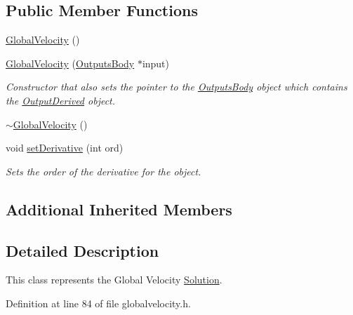 \subsection*{Public Member Functions}
\begin{DoxyCompactItemize}
\item 
\hyperlink{classosea_1_1ofreq_1_1_global_velocity_a444ab39b351acd4e6ca7dc8088e2a9b8}{Global\-Velocity} ()
\item 
\hyperlink{classosea_1_1ofreq_1_1_global_velocity_a7992180d42ae3558cdcccfe56550ed94}{Global\-Velocity} (\hyperlink{classosea_1_1ofreq_1_1_outputs_body}{Outputs\-Body} $\ast$input)
\begin{DoxyCompactList}\small\item\em Constructor that also sets the pointer to the \hyperlink{classosea_1_1ofreq_1_1_outputs_body}{Outputs\-Body} object which contains the \hyperlink{classosea_1_1ofreq_1_1_output_derived}{Output\-Derived} object. \end{DoxyCompactList}\item 
\hyperlink{classosea_1_1ofreq_1_1_global_velocity_a2b8f719180b1786a582d90603db8f2d8}{$\sim$\-Global\-Velocity} ()
\item 
void \hyperlink{classosea_1_1ofreq_1_1_global_velocity_a11229a6dbc7f85f3c321b5eddb127f10}{set\-Derivative} (int ord)
\begin{DoxyCompactList}\small\item\em Sets the order of the derivative for the object. \end{DoxyCompactList}\end{DoxyCompactItemize}
\subsection*{Additional Inherited Members}


\subsection{Detailed Description}
This class represents the Global Velocity \hyperlink{classosea_1_1ofreq_1_1_solution}{Solution}. 

Definition at line 84 of file globalvelocity.\-h.



